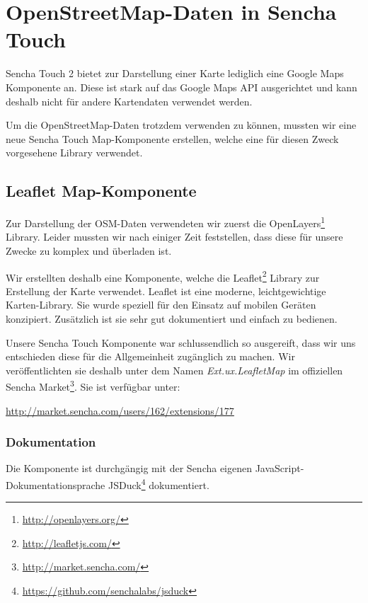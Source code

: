 \chapter{OpenStreetMap-Daten in Sencha Touch}
\label{leaflet-sencha-komponente}

Sencha Touch 2 bietet zur Darstellung einer Karte lediglich eine Google Maps Komponente an.
Diese ist stark auf das Google Maps API ausgerichtet und kann deshalb nicht für andere Kartendaten verwendet werden.

Um die OpenStreetMap-Daten trotzdem verwenden zu können, mussten wir eine neue Sencha Touch Map-Komponente erstellen, welche eine für diesen Zweck vorgesehene Library verwendet.

\section{Leaflet Map-Komponente}

Zur Darstellung der OSM-Daten verwendeten wir zuerst die OpenLayers\footnote{\url{http://openlayers.org/}} Library.
Leider mussten wir nach einiger Zeit feststellen, dass diese für unsere Zwecke zu komplex und überladen ist.

Wir erstellten deshalb eine Komponente, welche die Leaflet\footnote{\url{http://leafletjs.com/}} Library zur Erstellung der Karte verwendet.
Leaflet ist eine moderne, leichtgewichtige Karten-Library.
Sie wurde speziell für den Einsatz auf mobilen Geräten konzipiert.
Zusätzlich ist sie sehr gut dokumentiert und einfach zu bedienen.

Unsere Sencha Touch Komponente war schlussendlich so ausgereift, dass wir uns entschieden diese für die Allgemeinheit zugänglich zu machen.
Wir veröffentlichten sie deshalb unter dem Namen \emph{Ext.ux.LeafletMap} im offiziellen Sencha Market\footnote{\url{http://market.sencha.com/}}.
Sie ist verfügbar unter:

\begin{center}
\url{http://market.sencha.com/users/162/extensions/177}
\end{center}

\subsection{Dokumentation}
Die Komponente ist durchgängig mit der Sencha eigenen JavaScript-Dokumentationsprache JSDuck\footnote{\url{https://github.com/senchalabs/jsduck}} dokumentiert.